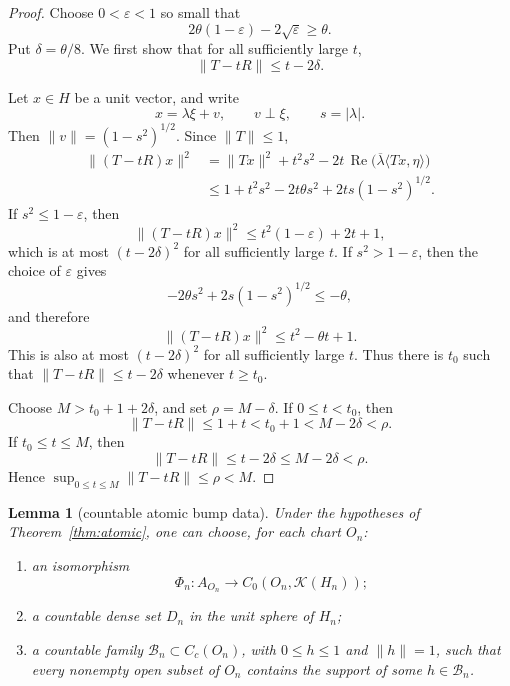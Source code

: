\documentclass[11pt]{article}
\newtheorem{lemma}{Lemma}
\newcommand{\Kcal}{\mathcal K}
\begin{document}
\begin{proof}
Choose \(0<\varepsilon<1\) so small that
\[
        2\theta(1-\varepsilon)-2\sqrt{\varepsilon}\ge\theta.
\]
Put \(\delta=\theta/8\).  We first show that for all sufficiently large
\(t\),
\[
        \|T-tR\|\le t-2\delta.
\]

Let \(x\in H\) be a unit vector, and write
\[
        x=\lambda\xi+v,
        \qquad
        v\perp\xi,
        \qquad
        s=|\lambda|.
\]
Then \(\|v\|=(1-s^2)^{1/2}\).  Since \(\|T\|\le1\),
\[
\begin{aligned}
 \|(T-tR)x\|^2
 &= \|Tx\|^2+t^2s^2
    -2t\,\operatorname{Re}\bigl(\overline{\lambda}\langle Tx,\eta\rangle\bigr)\\
 &\le 1+t^2s^2
    -2t\theta s^2+2t s(1-s^2)^{1/2}.
\end{aligned}
\]
If \(s^2\le1-\varepsilon\), then
\[
        \|(T-tR)x\|^2\le t^2(1-\varepsilon)+2t+1,
\]
which is at most \((t-2\delta)^2\) for all sufficiently large \(t\).
If \(s^2>1-\varepsilon\), then the choice of \(\varepsilon\) gives
\[
        -2\theta s^2+2s(1-s^2)^{1/2}\le -\theta,
\]
and therefore
\[
        \|(T-tR)x\|^2\le t^2-\theta t+1.
\]
This is also at most \((t-2\delta)^2\) for all sufficiently large \(t\).  Thus
there is \(t_0\) such that \(\|T-tR\|\le t-2\delta\) whenever \(t\ge t_0\).

Choose \(M>t_0+1+2\delta\), and set \(\rho=M-\delta\).  If \(0\le t<t_0\),
then
\[
        \|T-tR\|\le 1+t<t_0+1<M-2\delta<\rho.
\]
If \(t_0\le t\le M\), then
\[
        \|T-tR\|\le t-2\delta\le M-2\delta<\rho.
\]
Hence \(\sup_{0\le t\le M}\|T-tR\|\le\rho<M\).
\end{proof}

\begin{lemma}[countable atomic bump data]
\label{lem:data}
Under the hypotheses of Theorem~\ref{thm:atomic}, one can choose, for each
chart \(O_n\):
\begin{enumerate}
    \item an isomorphism
          \[
             \Phi_n:A_{O_n}\longrightarrow C_0(O_n,\Kcal(H_n));
          \]
    \item a countable dense set \(D_n\) in the unit sphere of \(H_n\);
    \item a countable family \(\mathcal B_n\subset C_c(O_n)\), with
          \(0\le h\le1\) and \(\|h\|=1\), such that every nonempty open
          subset of \(O_n\) contains the support of some \(h\in\mathcal B_n\).
\end{enumerate}
\end{lemma}
\end{document}
